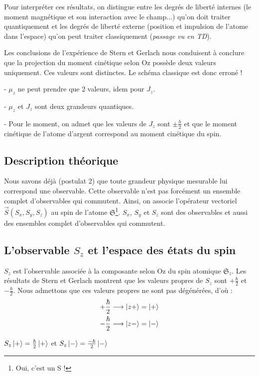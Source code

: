 \documentclass[12pt,a4paper,titlepage]{book}
\begin{document}
Pour interpréter ces résultats, on distingue entre les degrés de liberté internes (le moment magnétique et son interaction avec le champ...) qu'on doit traiter quantiquement et les degrés de liberté externe (position et impulsion de l'atome dans l'espace) qu'on peut traiter classiquement (\textit{passage vu en TD}).

Les conclusions de l'expérience de Stern et Gerlach nous conduisent à conclure que la projection du moment cinétique selon Oz possède deux valeurs uniquement. Ces valeurs sont distinctes. Le schéma classique est donc erroné !

- $\mu_z$ ne peut prendre que 2 valeurs, idem pour $J_z$.

- $\mu_z$ et $J_z$ sont deux grandeurs quantiques.

- Pour le moment, on admet que les valeurs de $J_z$ sont $\pm \frac{h}{2}$ et que le moment cinétique de l'atome d'argent correspond au moment cinétique du spin.

\subsection{Description théorique}

Nous savons déjà (postulat 2) que toute grandeur physique mesurable lui correspond une observable. Cette observable n'est pas forcément un ensemble complet d'observables qui commutent. Ainsi, on associe l'opérateur vectoriel $\overrightarrow{S}(S_x , S_y , S_z)$ au spin de l'atome $\mathfrak{S}$\footnote{Oui, c'est un S !}. $S_x$, $S_y$ et $S_z$ sont des observables et aussi des ensembles complet d'observables qui commutent.

\subsection{L'observable $S_z$ et l'espace des états du spin}

$S_z$ est l'observable associée à la composante selon Oz du spin atomique $\mathfrak{S}_z$. Les résultats de Stern et Gerlach montrent que les valeurs propres  de $S_z$ sont $+\frac{\hbar}{2}$ et $-\frac{\hbar}{2}$. Nous admettons que ces valeurs propres ne sont pas dégénérées, d'où :
\begin{align*}
+ \frac{\hbar}{2} \longrightarrow \ket{z+} &= \ket+ \\
- \frac{\hbar}{2} \longrightarrow \ket{z-} &= \ket-
\end{align*}
\begin{center}
$S_z \ket+ = \frac{\hbar}{2} \ket+$ et $S_z \ket- = \frac{-\hbar}{2} \ket-$
\end{center}
\end{document}
